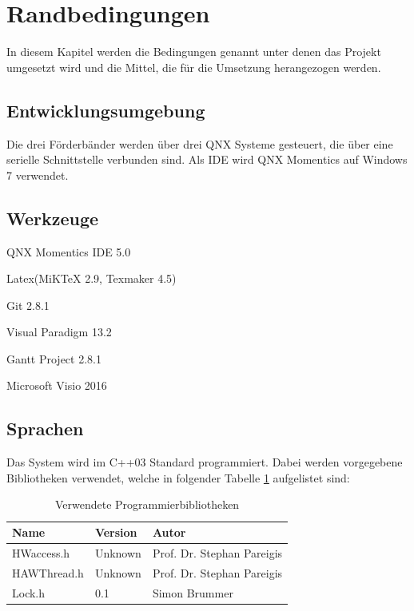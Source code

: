 \documentclass[a4paper, 11pt]{article}
\begin{document}
\section{Randbedingungen}
In diesem Kapitel werden die Bedingungen genannt unter denen das Projekt umgesetzt wird und die Mittel, die für die Umsetzung herangezogen werden.

\subsection{Entwicklungsumgebung}
Die drei Förderbänder werden über drei QNX Systeme gesteuert, die über eine serielle Schnittstelle verbunden sind. Als IDE wird QNX Momentics auf Windows 7 verwendet.

\subsection{Werkzeuge}
\begin{compactenum}[-]
    \item QNX Momentics IDE 5.0
    \item Latex(MiKTeX 2.9, Texmaker 4.5)
    \item Git 2.8.1
    \item Visual Paradigm 13.2
    \item Gantt Project 2.8.1
    \item Microsoft Visio 2016
\end{compactenum}

\subsection{Sprachen}
Das System wird im C++03 Standard programmiert. Dabei werden vorgegebene Bibliotheken verwendet, welche in folgender Tabelle \ref{bibl} aufgelistet sind:
\medskip
\begin{table}[h]
\centering
    \begin{tabular}{|l|l|l|}
    \hline
    \textbf{Name}&\textbf{Version}&\textbf{Autor}\\
    \hline
    HWaccess.h&Unknown&Prof. Dr. Stephan Pareigis\\
    \hline
    HAWThread.h&Unknown&Prof. Dr. Stephan Pareigis \\
    \hline
    Lock.h&0.1&Simon Brummer \\
    \hline
    \end{tabular}
    \caption{Verwendete Programmierbibliotheken}
    \label{bibl}
\end{table}
\end{document}
